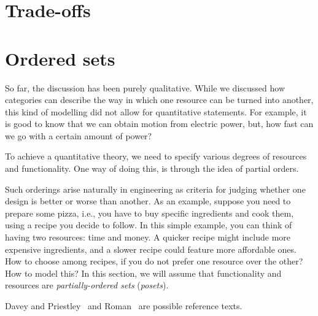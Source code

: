 
\section{Trade-offs}











\section{Ordered sets}

So far, the discussion has been purely qualitative. While we discussed how
categories can describe the way in which one resource can be turned into another,
this kind of modelling did not allow for quantitative statements. For example, it
is good to know that we can obtain motion from electric power, but, how fast can
we go with a certain amount of power?

To achieve a quantitative theory, we need to specify various degrees of resources and functionality.
One way of doing this, is through the idea of partial orders.


Such orderings arise naturally in engineering as criteria for judging whether one design is better or worse than another. As an example, suppose you need to prepare some pizza, i.e., you have to buy specific ingredients and cook them, using a recipe you decide to follow. In this simple example, you can think of having two resources: time and money. A quicker recipe might include more expensive ingredients, and a slower recipe could feature more affordable ones. How to choose among recipes, if you do not prefer one resource over the other? How to model this? In this section, we will assume that functionality and resources
are \emph{partially-ordered sets} (\emph{posets}).

Davey and Priestley~\cite{davey02}
and Roman~\cite{roman08} are possible reference texts.

